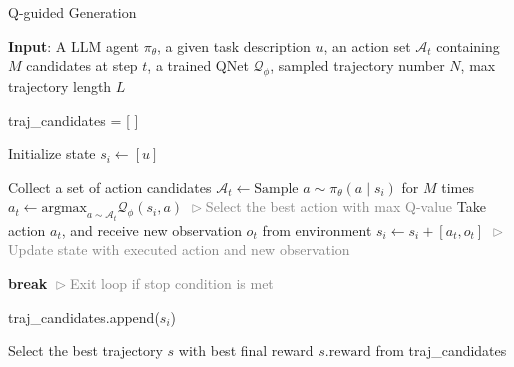 \begin{algorithm}[tb]
\caption{Q-guided Generation}
\label{algo:q-explore}
\begin{algorithmic}
\STATE \textbf{Input}: A LLM agent $\pi_\theta$, a given task description $u$, an action set $\mathcal{A}_{t}$ containing $M$ candidates at step $t$, a trained QNet $\mathcal{Q}_\phi$, sampled trajectory number $N$, max trajectory length $L$

   \STATE traj\_candidates = [ ]
   
      \STATE Initialize state $s_i \gets [u]$
      
         \STATE Collect a set of action candidates $\mathcal{A}_t \gets \text{Sample } a \sim \pi_\theta( a \mid s_i)$ for $M$ times
         \STATE $a_t \gets \text{argmax}_{a \sim \mathcal{A}_t} \mathcal{Q}_\phi(s_i, a)$ 
         \hfill \textcolor{gray}{$\vartriangleright$Select the best action with max Q-value}
         \STATE Take action $a_t$, and receive new observation $o_t$ from environment
         \STATE $s_i \gets s_i + [a_t, o_t]$ \hfill \textcolor{gray}{$\vartriangleright$Update state with executed action and new observation}
         
            \STATE \textbf{break} \hfill \textcolor{gray}{$\vartriangleright$Exit loop if stop condition is met}
         \ENDIF
      \ENDFOR
      
      \STATE traj\_candidates.append($s_i$)
   \ENDFOR
   
   \STATE Select the best trajectory $s$ with best final reward $s.\text{reward}$ from traj\_candidates
\end{algorithmic}
\end{algorithm}
